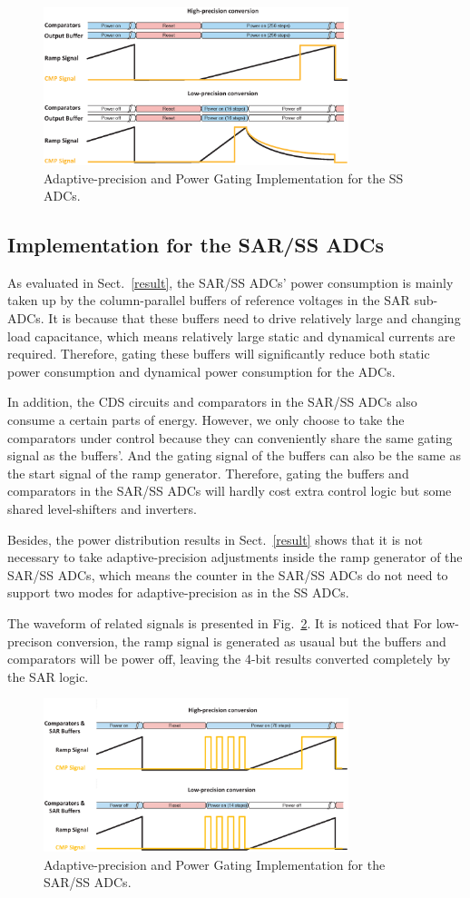 \begin{figure}[htbp]
	\centerline{\includegraphics[width=3.5in]{./Figures/SS_pg.eps}}
	\caption{Adaptive-precision and Power Gating Implementation for the SS ADCs.}
	\label{SS_pg}
\end{figure} 

\subsection{Implementation for the SAR/SS ADCs}

As evaluated in Sect.~\ref{result}, the SAR/SS ADCs’ power consumption is mainly taken up by the column-parallel buffers of reference voltages in the SAR sub-ADCs.
It is because that these buffers need to drive relatively large and changing load capacitance, which means relatively large static and dynamical currents are required.
Therefore, gating these buffers will significantly reduce both static power consumption and dynamical power consumption for the ADCs.

In addition, the CDS circuits and comparators in the SAR/SS ADCs also consume a certain parts of energy. However, we only choose to take the comparators under control because they can conveniently share the same gating signal as the buffers'. And the gating signal of the buffers can also be the same as the start signal of the ramp generator. Therefore, gating the buffers and comparators in the SAR/SS ADCs will hardly cost extra control logic but some shared level-shifters and inverters.

Besides, the power distribution results in Sect.~\ref{result} shows that it is not necessary to take adaptive-precision adjustments inside the ramp generator of the SAR/SS ADCs, which means the counter in the SAR/SS ADCs do not need to support two modes for adaptive-precision as in the SS ADCs.

The waveform of related signals is presented in Fig.~\ref{SAR_pg}. It is noticed that For low-precison conversion, the ramp signal is generated as usaual but the buffers and comparators will be power off, leaving the 4-bit results converted completely by the SAR logic. 

\begin{figure}[htbp]
	\centerline{\includegraphics[width=3.5in]{./Figures/SAR_pg.eps}}
	\caption{Adaptive-precision and Power Gating Implementation for the SAR/SS ADCs.}
	\label{SAR_pg}
\end{figure} 